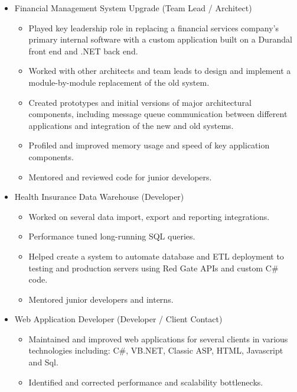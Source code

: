 \documentclass[12pt,letterpaper,sans]{moderncv}
\begin{document}
    \begin{itemize}[leftmargin=1.24in]
        \item Financial Management System Upgrade (Team Lead / Architect)
            \begin{itemize}
                \item Played key leadership role in replacing a financial services company's primary internal software with a custom application built on a Durandal front end and .NET back end.
                \item Worked with other architects and team leads to design and implement a module-by-module replacement of the old system.
                \item Created prototypes and initial versions of major architectural components, including message queue \mbox{communication} between different applications and integration of the new and old systems.
                \item Profiled and improved memory usage and speed of key application components.
                \item Mentored and reviewed code for junior developers.
            \end{itemize}
        \item Health Insurance Data Warehouse (Developer)
        	\begin{itemize}
	        	\item Worked on several data import, export and reporting integrations.
	        	\item Performance tuned long-running SQL queries.
	        	\item Helped create a system to automate database and ETL deployment to testing and production servers using Red Gate APIs and custom C\# code.
	        	\item Mentored junior developers and interns.
        	\end{itemize}
        \item Web Application Developer (Developer / Client Contact)
            \begin{itemize}
            	\item Maintained and improved web applications for several clients in various technologies including: C\#, VB.NET, Classic ASP, HTML, Javascript and Sql.
                \item Identified and corrected performance and scalability bottlenecks.

\end{itemize}
\end{itemize}
\end{document}
